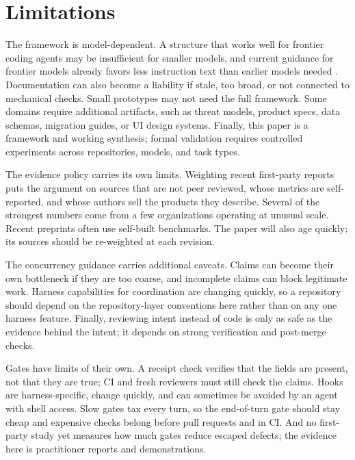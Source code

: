 \documentclass[11pt]{article}
\begin{document}
\section{Limitations}
The framework is model-dependent. A structure that works well for frontier coding agents may be insufficient for smaller models, and current guidance for frontier models already favors less instruction text than earlier models needed \cite{shihipar2026context}. Documentation can also become a liability if stale, too broad, or not connected to mechanical checks. Small prototypes may not need the full framework. Some domains require additional artifacts, such as threat models, product specs, data schemas, migration guides, or UI design systems. Finally, this paper is a framework and working synthesis; formal validation requires controlled experiments across repositories, models, and task types.

The evidence policy carries its own limits. Weighting recent first-party reports puts the argument on sources that are not peer reviewed, whose metrics are self-reported, and whose authors sell the products they describe. Several of the strongest numbers come from a few organizations operating at unusual scale. Recent preprints often use self-built benchmarks. The paper will also age quickly; its sources should be re-weighted at each revision.

The concurrency guidance carries additional caveats. Claims can become their own bottleneck if they are too coarse, and incomplete claims can block legitimate work. Harness capabilities for coordination are changing quickly, so a repository should depend on the repository-layer conventions here rather than on any one harness feature. Finally, reviewing intent instead of code is only as safe as the evidence behind the intent; it depends on strong verification and post-merge checks.

Gates have limits of their own. A receipt check verifies that the fields are present, not that they are true; CI and fresh reviewers must still check the claims. Hooks are harness-specific, change quickly, and can sometimes be avoided by an agent with shell access. Slow gates tax every turn, so the end-of-turn gate should stay cheap and expensive checks belong before pull requests and in CI. And no first-party study yet measures how much gates reduce escaped defects; the evidence here is practitioner reports and demonstrations.
\end{document}
